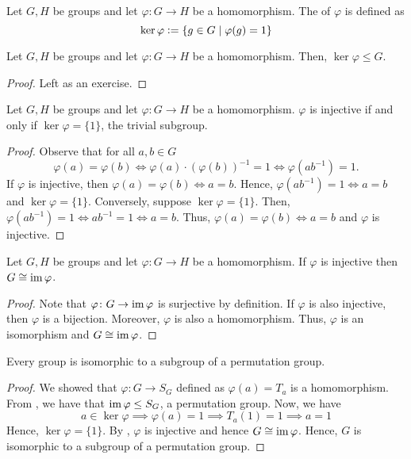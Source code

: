 \begin{defn}
    Let $G,H$ be groups and let $\varphi \colon G \to H$ be a homomorphism. The  of $\varphi$ is defined as
    \[
        \ker\varphi \vcentcolon= \left\{ g \in G \mid \varphi(g) = 1 \right\}
    \]
\end{defn}
\begin{prop} \label{prop:kernel-subgroup}
    Let $G,H$ be groups and let $\varphi \colon G \to H$ be a homomorphism. Then, $\ker\varphi \leq G$.
\end{prop}
\begin{proof}
    Left as an exercise.
\end{proof}
\begin{prop} \label{prop:injective-trivial-kernel}
    Let $G,H$ be groups and let $\varphi \colon G \to H$ be a homomorphism. $\varphi$ is injective if and only if $\ker\varphi = \{1\}$, the trivial subgroup.
\end{prop}
\begin{proof}
    Observe that for all $a,b \in G$
    \[
        \varphi(a) = \varphi(b) \iff \varphi(a)\cdot (\varphi(b))^{-1} = 1 \iff \varphi(ab^{-1}) = 1.
    \]
    If $\varphi$ is injective, then $\varphi(a) = \varphi(b) \iff a = b$. Hence, $\varphi(ab^{-1}) = 1 \iff a = b$ and $\ker\varphi = \{1\}$. Conversely, suppose $\ker\varphi = \{1\}$. Then, $\varphi(ab^{-1}) = 1 \iff ab^{-1} = 1 \iff a = b$. Thus, $\varphi(a) = \varphi(b) \iff a = b$ and $\varphi$ is injective.
\end{proof}

\begin{prop} \label{prop:im-isomorphic-to-G}
    Let $G,H$ be groups and let $\varphi \colon G \to H$ be a homomorphism. If $\varphi$ is injective then $G \cong \operatorname{im}\varphi$.
\end{prop}
\begin{proof}
    Note that $\varphi \colon G \to \operatorname{im}\varphi$ is surjective by definition. If $\varphi$ is also injective, then $\varphi$ is a bijection. Moreover, $\varphi$ is also a homomorphism. Thus, $\varphi$ is an isomorphism and $G \cong \operatorname{im}\varphi$.
\end{proof}

\begin{theorem} \label{thm:cayley}
    Every group is isomorphic to a subgroup of a permutation group.
\end{theorem}
\begin{proof}
    We showed that $\varphi \colon G \to S_G$ defined as $\varphi(a) = T_a$ is a homomorphism. From , we have that $\operatorname{im}\varphi \leq S_G$, a permutation group. Now, we have
    \[
        a \in \ker\varphi \implies \varphi(a) = 1 \implies T_a(1) = 1 \implies a = 1
    \]
    Hence, $\ker\varphi = \{1\}$. By , $\varphi$ is injective and hence $G \cong \operatorname{im}\varphi$. Hence, $G$ is isomorphic to a subgroup of a permutation group.
\end{proof}


